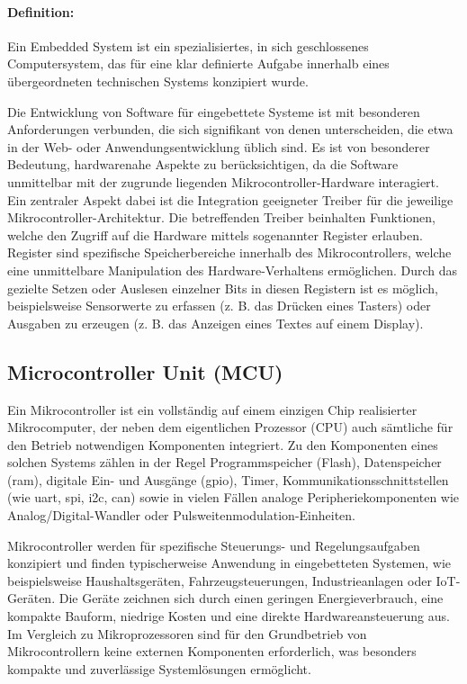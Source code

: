 \paragraph{Definition:}
Ein Embedded System ist ein spezialisiertes, in sich geschlossenes Computersystem, das für eine klar definierte Aufgabe innerhalb eines übergeordneten technischen Systems konzipiert wurde.

\vspace{6 mm}

Die Entwicklung von Software für eingebettete Systeme ist mit besonderen Anforderungen verbunden, die sich signifikant von denen unterscheiden, die etwa in der Web- oder Anwendungsentwicklung üblich sind.
Es ist von besonderer Bedeutung, hardwarenahe Aspekte zu berücksichtigen, da die Software unmittelbar mit der zugrunde liegenden Mikrocontroller-Hardware interagiert.
Ein zentraler Aspekt dabei ist die Integration geeigneter Treiber für die jeweilige Mikrocontroller-Architektur.
Die betreffenden Treiber beinhalten Funktionen, welche den Zugriff auf die Hardware mittels sogenannter Register erlauben.
Register sind spezifische Speicherbereiche innerhalb des Mikrocontrollers, welche eine unmittelbare Manipulation des Hardware-Verhaltens ermöglichen.
Durch das gezielte Setzen oder Auslesen einzelner Bits in diesen Registern ist es möglich, beispielsweise Sensorwerte zu erfassen (z. B. das Drücken eines Tasters) oder Ausgaben zu erzeugen (z. B. das Anzeigen eines Textes auf einem Display).




\subsection{Microcontroller Unit (MCU)}
Ein Mikrocontroller ist ein vollständig auf einem einzigen Chip realisierter Mikrocomputer, der neben dem eigentlichen Prozessor (CPU) auch sämtliche für den Betrieb notwendigen Komponenten integriert. 
Zu den Komponenten eines solchen Systems zählen in der Regel Programmspeicher (Flash), Datenspeicher (\gls{ram}), digitale Ein- und Ausgänge (\gls{gpio}), Timer, Kommunikationsschnittstellen (wie \gls{uart}, \gls{spi}, \gls{i2c}, \gls{can}) sowie in vielen Fällen analoge Peripheriekomponenten wie Analog/Digital-Wandler oder Pulsweitenmodulation-Einheiten.

Mikrocontroller werden für spezifische Steuerungs- und Regelungsaufgaben konzipiert und finden typischerweise Anwendung in eingebetteten Systemen, wie beispielsweise Haushaltsgeräten, Fahrzeugsteuerungen, Industrieanlagen oder IoT-Geräten. 
Die Geräte zeichnen sich durch einen geringen Energieverbrauch, eine kompakte Bauform, niedrige Kosten und eine direkte Hardwareansteuerung aus. 
Im Vergleich zu Mikroprozessoren sind für den Grundbetrieb von Mikrocontrollern keine externen Komponenten erforderlich, was besonders kompakte und zuverlässige Systemlösungen ermöglicht.


